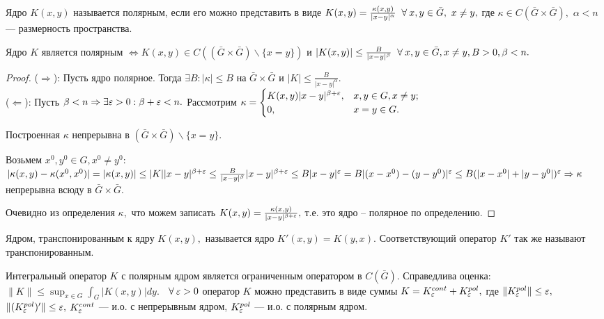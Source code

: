 \begin{definition}
Ядро $K(x,y)$ называется полярным, если его можно представить в виде $K(x,y) = \frac{\kappa(x,y)}{|x-y|^\alpha} \;\;\forall\: x,y \in \bar G,\ x\ne y,$ где $\kappa \in C(\bar G \times \bar G),$ $\alpha < n$ --- размерность пространства.
\end{definition}

\begin{lemma}
Ядро $K$ является полярным $\Leftrightarrow K(x,y) \in C((\bar G \times \bar G)\backslash\{x=y\})$ и $|K(x,y)| \le \frac{B}{|x-y|^\beta} \;\;\forall\: x, y \in \bar G, x \ne y, B>0, \beta < n.$
\end{lemma}

\begin{proof}
($\Rightarrow$): Пусть ядро полярное. Тогда $\exists B: |\kappa| \le B$ на $\bar G \times \bar G$ и $|K| \le \frac{B}{|x-y|^\alpha}.$
\\
($\Leftarrow$): Пусть $\beta < n \Rightarrow \exists \varepsilon > 0: \beta+\varepsilon < n.$ Рассмотрим $\kappa =  \begin{cases}
   K(x,y)|x-y|^{\beta+\varepsilon}, &x,y\in G, x\ne y;\\
   0, & x=y\in G.
 \end{cases}
$

Построенная $\kappa$ непрерывна в $(\bar G \times \bar G)\backslash\{x=y\}.$

Возьмем $x^0,y^0 \in G, x^0 \ne y^0:$
$|\kappa(x,y) - \kappa(x^0, x^0)| = |\kappa(x,y)| \le |K||x-y|^{\beta+\varepsilon} \le \frac{B}{|x-y|^\beta}|x-y|^{\beta+\varepsilon}\le B|x-y|^\varepsilon = B|(x-x^0)-(y-y^0)|^\varepsilon \le B(|x-x^0|+|y-y^0|)^\varepsilon \Rightarrow \kappa$ непрерывна всюду в $\bar G \times \bar G.$

Очевидно из определения $\kappa,$ что можем записать $K(x,y) = \frac{\kappa(x,y)}{|x-y|^{\beta+\varepsilon}},$ т.е. это ядро -- полярное по определению.
\end{proof}


\begin{definition}
Ядром, транспонированным к ядру $K(x,y),$ называется ядро $K'(x,y) = K(y,x).$ Соответствующий оператор $K'$ так же называют транспонированным.
\end{definition}

\begin{theorem}
Интегральный оператор $K$ с полярным ядром является ограниченным оператором в $C(\bar G).$ Справедлива оценка: $\|K\| \le \sup_{x\in G}\int_G|K(x,y)|dy.$ $\;\;\forall\: \varepsilon > 0$ оператор $K$ можно представить в виде суммы $K = K_\varepsilon^{cont}+K_\varepsilon^{pol},$ где $\|K_\varepsilon^{pol}\| \le \varepsilon,$ $\|(K_\varepsilon^{pol})'\| \le \varepsilon,$ $K_\varepsilon^{cont}$ --- и.о. с непрерывным ядром, $K_\varepsilon^{pol}$ --- и.о. с полярным ядром.
\end{theorem}

